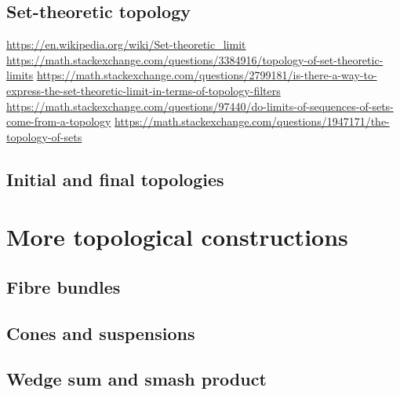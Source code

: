 \section{Set-theoretic topology}
\url{https://en.wikipedia.org/wiki/Set-theoretic_limit}
\url{https://math.stackexchange.com/questions/3384916/topology-of-set-theoretic-limits}
\url{https://math.stackexchange.com/questions/2799181/is-there-a-way-to-express-the-set-theoretic-limit-in-terms-of-topology-filters}
\url{https://math.stackexchange.com/questions/97440/do-limits-of-sequences-of-sets-come-from-a-topology}
\url{https://math.stackexchange.com/questions/1947171/the-topology-of-sets}

\section{Initial and final topologies}

\chapter{More topological constructions}
\section{Fibre bundles}
\section{Cones and suspensions}
\section{Wedge sum and smash product}